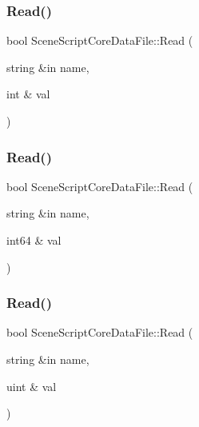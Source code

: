 \hypertarget{class_scene_script_core_data_file_a85ba435b8992662256908a2093cce606}{}\label{class_scene_script_core_data_file_a85ba435b8992662256908a2093cce606} 
\subsubsection{\texorpdfstring{Read()}{Read()}\hspace{0.1cm}{\footnotesize\ttfamily [4/8]}}
{\footnotesize\ttfamily bool Scene\+Script\+Core\+Data\+File\+::\+Read (\begin{DoxyParamCaption}\item[{string \&in}]{name,  }\item[{int \&}]{val }\end{DoxyParamCaption})}

\hypertarget{class_scene_script_core_data_file_a07169362f213c81778f18087c8f021f8}{}\label{class_scene_script_core_data_file_a07169362f213c81778f18087c8f021f8} 
\subsubsection{\texorpdfstring{Read()}{Read()}\hspace{0.1cm}{\footnotesize\ttfamily [5/8]}}
{\footnotesize\ttfamily bool Scene\+Script\+Core\+Data\+File\+::\+Read (\begin{DoxyParamCaption}\item[{string \&in}]{name,  }\item[{int64 \&}]{val }\end{DoxyParamCaption})}

\hypertarget{class_scene_script_core_data_file_a7aae22346788135d38266ea03d878cf9}{}\label{class_scene_script_core_data_file_a7aae22346788135d38266ea03d878cf9} 
\subsubsection{\texorpdfstring{Read()}{Read()}\hspace{0.1cm}{\footnotesize\ttfamily [6/8]}}
{\footnotesize\ttfamily bool Scene\+Script\+Core\+Data\+File\+::\+Read (\begin{DoxyParamCaption}\item[{string \&in}]{name,  }\item[{uint \&}]{val }\end{DoxyParamCaption})}

